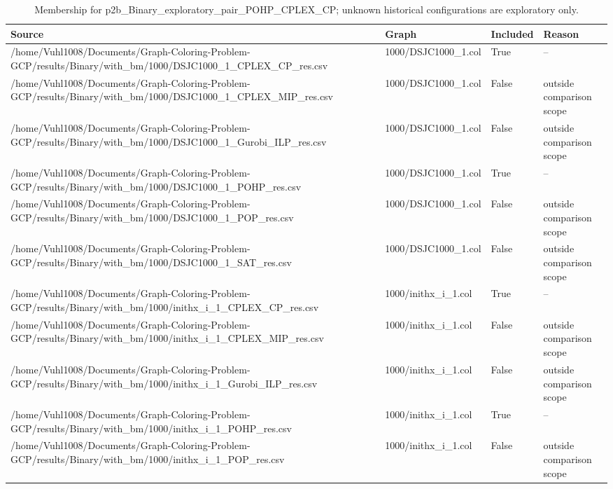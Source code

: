 \begin{table}[htbp]
\centering
\caption{Membership for p2b\_Binary\_exploratory\_pair\_POHP\_CPLEX\_CP; unknown historical configurations are exploratory only.}
\label{tab:p2b-Binary-exploratory-pair-POHP-CPLEX-CP-membership}
\begin{tabular}{llll}
\hline
Source & Graph & Included & Reason \\
\hline
/home/Vuhl1008/Documents/Graph-Coloring-Problem-GCP/results/Binary/with\_bm/1000/DSJC1000\_1\_CPLEX\_CP\_res.csv & 1000/DSJC1000\_1.col & True & -- \\
/home/Vuhl1008/Documents/Graph-Coloring-Problem-GCP/results/Binary/with\_bm/1000/DSJC1000\_1\_CPLEX\_MIP\_res.csv & 1000/DSJC1000\_1.col & False & outside comparison scope \\
/home/Vuhl1008/Documents/Graph-Coloring-Problem-GCP/results/Binary/with\_bm/1000/DSJC1000\_1\_Gurobi\_ILP\_res.csv & 1000/DSJC1000\_1.col & False & outside comparison scope \\
/home/Vuhl1008/Documents/Graph-Coloring-Problem-GCP/results/Binary/with\_bm/1000/DSJC1000\_1\_POHP\_res.csv & 1000/DSJC1000\_1.col & True & -- \\
/home/Vuhl1008/Documents/Graph-Coloring-Problem-GCP/results/Binary/with\_bm/1000/DSJC1000\_1\_POP\_res.csv & 1000/DSJC1000\_1.col & False & outside comparison scope \\
/home/Vuhl1008/Documents/Graph-Coloring-Problem-GCP/results/Binary/with\_bm/1000/DSJC1000\_1\_SAT\_res.csv & 1000/DSJC1000\_1.col & False & outside comparison scope \\
/home/Vuhl1008/Documents/Graph-Coloring-Problem-GCP/results/Binary/with\_bm/1000/inithx\_i\_1\_CPLEX\_CP\_res.csv & 1000/inithx\_i\_1.col & True & -- \\
/home/Vuhl1008/Documents/Graph-Coloring-Problem-GCP/results/Binary/with\_bm/1000/inithx\_i\_1\_CPLEX\_MIP\_res.csv & 1000/inithx\_i\_1.col & False & outside comparison scope \\
/home/Vuhl1008/Documents/Graph-Coloring-Problem-GCP/results/Binary/with\_bm/1000/inithx\_i\_1\_Gurobi\_ILP\_res.csv & 1000/inithx\_i\_1.col & False & outside comparison scope \\
/home/Vuhl1008/Documents/Graph-Coloring-Problem-GCP/results/Binary/with\_bm/1000/inithx\_i\_1\_POHP\_res.csv & 1000/inithx\_i\_1.col & True & -- \\
/home/Vuhl1008/Documents/Graph-Coloring-Problem-GCP/results/Binary/with\_bm/1000/inithx\_i\_1\_POP\_res.csv & 1000/inithx\_i\_1.col & False & outside comparison scope \\

\end{tabular}
\end{table}
